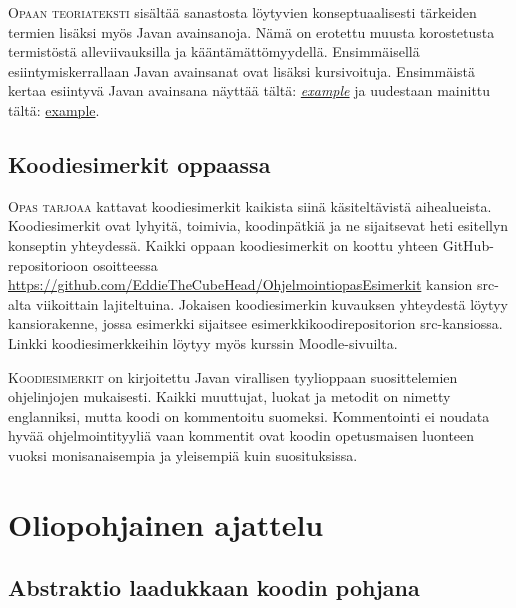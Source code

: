 \documentclass[openany]{book}
\newcommand{\newthought}[1]{\smallskip\textsc{#1}}
\newcommand{\javanogls}[1]{\underline{#1}}
\newcommand{\newjavanogls}[1]{\textit{\javanogls{#1}}}
\begin{document}
\newthought{Opaan teoriateksti} sisältää sanastosta löytyvien konseptuaalisesti tärkeiden termien
lisäksi myös Javan avainsanoja. Nämä on erotettu muusta korostetusta termistöstä alleviivauksilla
ja kääntämättömyydellä. Ensimmäisellä esiintymiskerrallaan Javan avainsanat ovat lisäksi
kursivoituja. Ensimmäistä kertaa esiintyvä Javan avainsana näyttää tältä: \newjavanogls{example}
ja uudestaan mainittu tältä: \javanogls{example}.


\section{Koodiesimerkit oppaassa}
\label{koodiesimerkeistä}

\newthought{Opas tarjoaa} kattavat koodiesimerkit kaikista siinä käsiteltävistä aihealueista.
Koodiesimerkit ovat lyhyitä, toimivia, koodinpätkiä ja ne sijaitsevat heti esitellyn konseptin
yhteydessä. Kaikki oppaan koodiesimerkit on koottu yhteen GitHub-repositorioon osoitteessa
\url{https://github.com/EddieTheCubeHead/OhjelmointiopasEsimerkit} kansion src-alta viikoittain
lajiteltuina. Jokaisen koodiesimerkin kuvauksen yhteydestä löytyy kansiorakenne, jossa esimerkki
sijaitsee esimerkkikoodirepositorion src-kansiossa. Linkki koodiesimerkkeihin löytyy myös kurssin
Moodle-sivuilta.

\newthought{Koodiesimerkit} on kirjoitettu Javan virallisen tyylioppaan suosittelemien
ohjelinjojen mukaisesti. Kaikki muuttujat, luokat ja metodit on nimetty englanniksi, mutta koodi
on kommentoitu suomeksi. Kommentointi ei noudata hyvää ohjelmointityyliä vaan kommentit ovat
koodin opetusmaisen luonteen vuoksi monisanaisempia ja yleisempiä kuin suosituksissa.


\mainmatter
\chapter{Oliopohjainen ajattelu}
\label{olioista}

\section{Abstraktio laadukkaan koodin pohjana}
\label{abstraktiosta}
\end{document}
